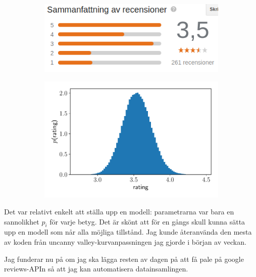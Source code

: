 \begin{figure}[ht]
    \centering
    \begin{subfigure}{.5\linewidth}
        \includegraphics[width=\textwidth]{pics/mcdonalds_nordstan_ratings.png}
        \caption{}
        \label{subfig:mcdonalds_nordstan_ratings}
    \end{subfigure}%
    \begin{subfigure}{.5\linewidth}
        \includegraphics[width=\textwidth]{pics/mcdonalds_nordstan_rating_probabilities_histogram.pdf}
        \caption{}
        \label{subfig:mcdonalds_nordstan_rating_probabilities_histogram}
    \end{subfigure}
    \caption{}
\end{figure}

Det var relativt enkelt att ställa upp en modell: parametrarna var bara en sannolikhet $p_i$ för varje betyg. Det är skönt att för en gångs skull kunna sätta upp en modell som når alla möjliga tillstånd. Jag kunde återanvända den mesta av koden från uncanny valley-kurvanpassningen jag gjorde i början av veckan.

Jag funderar nu på om jag ska lägga resten av dagen på att få pale på google reviews-APIn så att jag kan automatisera datainsamlingen.

